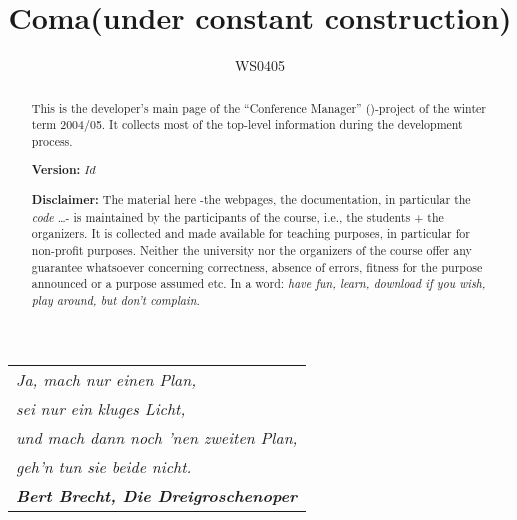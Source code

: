 \documentclass[11pt]{article}
\title{{\huge\bf Coma}\ifweb (under constant construction)\fi}
\author{WS0405}
\date{}
\begin{document}
\vspace{-2cm}


\ifweb

\fi

\maketitle{}



\begin{abstract}
  This is the developer's main page of the ``Conference Manager''
  (\Coma)-project of the winter term 2004/05. It collects most of the
  top-level information during the development process.

  \medskip
  
  \textbf{Version:} \texttt{$Id$}
  
  \medskip
  
  \textbf{Disclaimer:} The material here -the webpages, the documentation,
  in particular the \emph{code} \ldots- is maintained by the participants
  of the course, i.e., the students + the organizers. It is collected and
  made available for teaching purposes, in particular for non-profit
  purposes. Neither the university nor the organizers of the course offer
  any guarantee whatsoever concerning correctness, absence of errors,
  fitness for the purpose announced or a purpose assumed etc. In a word:
  \emph{have fun, learn, download if you wish, play around, but don't
    complain.}
\end{abstract}







%



{\centering
  \begin{minipage}{10cm}
    \begin{tabular}[t]{l}
    \em
    Ja, mach nur einen Plan, 
    \\
    \emph{sei nur ein kluges Licht, }
    \\ 
    \emph{und mach dann noch 'nen zweiten Plan, }
    \\
    \emph{geh'n tun sie beide nicht.}
    \\
    \textbf{\em Bert Brecht, Die Dreigroschenoper}
\end{tabular}
  \end{minipage}}
\end{document}
